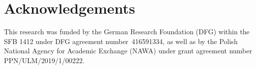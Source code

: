 \documentclass[output=paper,hidelinks]{langscibook}
\begin{document}
\section*{Acknowledgements}\largerpage

This research was funded by the German Research Foundation (DFG) within the SFB 1412 under DFG agreement number~416591334, as well as by the Polish National Agency for Academic Exchange (NAWA) under grant agreement number PPN/ULM/2019/1/00222.

{\sloppy\printbibliography[heading=subbibliography,notkeyword=this]}
\end{document}
